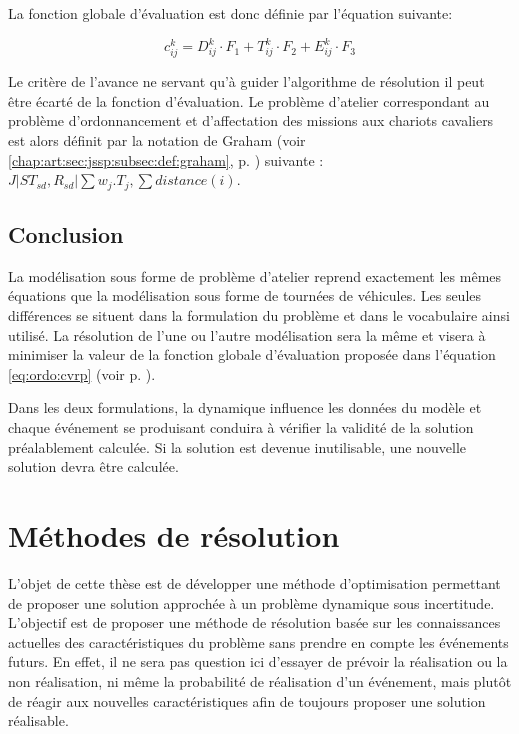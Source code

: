  La fonction globale d'évaluation est donc définie par l'équation suivante: 
 
 \begin{equation}
  \label{eq:costJSSP}
  c^k_{ij} = D^k_{ij} \cdot F_1 + T^k_{ij} \cdot F_2 + E^k_{ij} \cdot F_3
 \end{equation}

 Le critère de l'avance ne servant qu'à guider l'algorithme de résolution il peut être écarté de la fonction d'évaluation. Le problème d'atelier correspondant au problème d'ordonnancement et d'affectation des missions aux chariots cavaliers est alors définit par la notation de Graham (voir \ref{chap:art:sec:jssp:subsec:def:graham}, p. \pageref{chap:art:sec:jssp:subsec:def:graham}) suivante : ${ J|ST_{sd}, R_{sd}|\sum w_j.T_{j} , \sum distance(i)}$.
 
 \subsection{Conclusion}
 
 La modélisation sous forme de problème d'atelier reprend exactement les mêmes équations que la modélisation sous forme de tournées de véhicules. Les seules différences se situent dans la formulation du problème et dans le vocabulaire ainsi utilisé. La résolution de l'une ou l'autre modélisation sera la même et visera à minimiser la valeur de la fonction globale d'évaluation proposée dans l'équation \ref{eq:ordo:cvrp} (voir p. \pageref{eq:ordo:cvrp}).
 
 Dans les deux formulations, la dynamique influence les données du modèle et chaque événement se produisant conduira à vérifier la validité de la solution préalablement calculée. Si la solution est devenue inutilisable, une nouvelle solution devra être calculée.
 
\section{Méthodes de résolution} \label{chap:ordo:reso}

L'objet de cette thèse est de développer une méthode d'optimisation permettant de proposer une solution approchée à un problème dynamique sous incertitude. L'objectif est de proposer une méthode de résolution basée sur les connaissances actuelles des caractéristiques du problème sans prendre en compte les événements futurs. En effet, il ne sera pas question ici d'essayer de prévoir la réalisation ou la non réalisation, ni même la probabilité de réalisation d'un événement, mais plutôt de réagir aux nouvelles caractéristiques afin de toujours proposer une solution réalisable.

